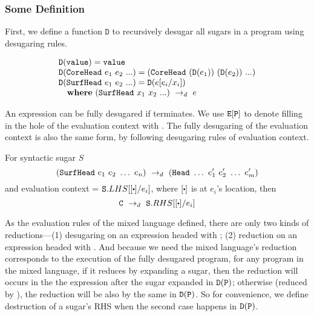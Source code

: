 \subsubsection{Some Definition}
First, we define a function $\mathtt{D}$ to recursively desugar all sugars in a program using desugaring rules.

\begin{Def}
\[
\begin{array}{lll}
	\mathtt{D}(\texttt{value}) = \texttt{value}\\
	\mathtt{D}(\texttt{CoreHead}~e_1~e_2~ ...) = (\texttt{CoreHead}~(\mathtt{D}(e_1))~(\mathtt{D}(e_2))~...)\\
	\mathtt{D}(\texttt{SurfHead}~e_1~e_2~ ...) = \mathtt{D}(e[e_i/x_i])\\
\quad \mbox{\bf where}~(\texttt{SurfHead}~x_1~x_2~ ...) ~\rightarrow_d~ e

\end{array}
\]

\end{Def}


An expression  can be fully desugared if  terminates. We use $\mbox{\tt E}[\mbox{\tt P}]$ to denote filling in the hole of the evaluation context  with .  The fully desugaring of the evaluation context is also the same form, by following desugaring rules of evaluation context.

\begin{Def}
	For syntactic sugar $S$
	\[
	(\mbox{\tt SurfHead}~e_1~e_2~\ldots~e_n) ~\rightarrow_d~ (\mbox{\tt Head}~\ldots~e_1'~e_2'~\ldots~e_m')
	\]
	and evaluation context  = $\m{S}.LHS[[\bigcdot]/e_i]$, where $[\bigcdot]$ is at $e_i$'s location, then
	\[
	\drule{\m{C}}{\m{S}.RHS[[\bigcdot]/e_i]}
	\]

\end{Def}
As the evaluation rules of the mixed language defined, there are only two kinds of reductions---(1) desugaring on an expression headed with ; (2) reduction on an expression headed with . And because we need the mixed language's reduction corresponds to the execution of the fully desugared program, for any program  in the mixed language, if it reduces by expanding a sugar, then the reduction will occurs in the the expression after the sugar expanded in $\mathtt{D}(\mbox{\tt P})$; otherwise (reduced by ), the reduction will be also by the same  in $\mathtt{D}(\mbox{\tt P})$.
So for convenience, we define destruction of a sugar's RHS when the second case happens in $\mathtt{D}(\mbox{\tt P})$.

